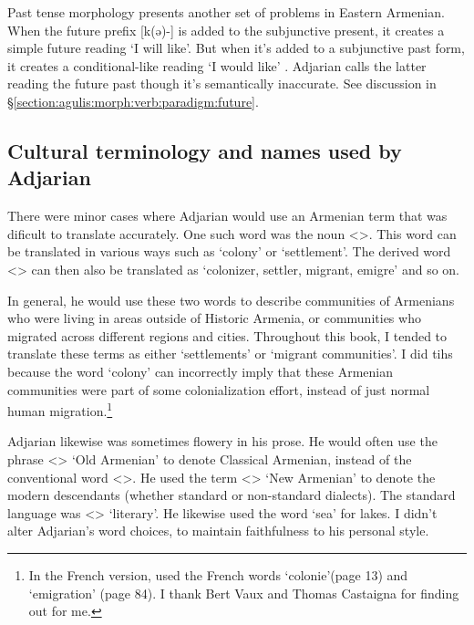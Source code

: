 Past tense morphology presents another set of problems in Eastern Armenian. When the future prefix [k(ə)-] is added to the subjunctive present, it creates a simple future reading `I will like'. But when it's added to a subjunctive past form, it creates a conditional-like reading `I would like' \citep[\S6.5.3]{DolatianEtAl-prep-IranianGrammar}.   Adjarian calls the latter reading the future past though it's semantically inaccurate. See discussion in \S\ref{section:agulis:morph:verb:paradigm:future}. 
 

 
\subsection{Cultural terminology and names used by Adjarian}\label{sec:HossepIntro:translation:name}

There were minor cases where Adjarian would use an Armenian term that was dificult to translate accurately. One such word was the noun <>. This word can be translated in various ways such as `colony' or `settlement'. The derived word <> can then also be translated as `colonizer, settler, migrant, emigre' and so on. 

In general, he would use these two words to describe communities of Armenians who were living in areas outside of Historic Armenia, or communities who migrated across different regions and cities. Throughout this book, I tended to translate these terms as either   `settlements' or `migrant communities'. I did tihs because the word `colony' can incorrectly imply that these Armenian communities were part of some colonialization effort, instead of just normal human migration.\footnote{In the French version, \citet{Adjarian-1909-ClassificationArmenianDialect} used the French words `colonie'(page 13) and `emigration' (page 84).  I thank Bert Vaux and Thomas Castaigna for finding out for me.  } 

Adjarian likewise was  sometimes flowery in his prose. He would often use the phrase <> `Old Armenian' to denote Classical Armenian, instead of the conventional word <>. He used the term <> `New Armenian' to denote the modern descendants (whether standard or non-standard dialects). The standard language was <> `literary'. He likewise used the word `sea' for lakes.    I didn't alter Adjarian's word choices, to maintain faithfulness to his personal style. 

